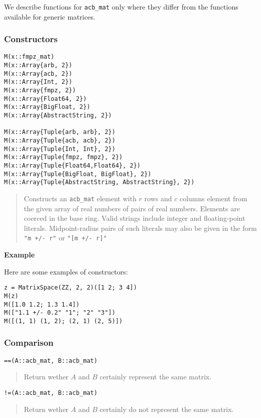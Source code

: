 \documentclass[a4paper,10pt]{article}
\newcommand{\code}{\lstinline}
\newcommand{\desc}[1]{\vspace{-3mm}\begin{quote}#1\end{quote}}
\begin{document}
{{We describe functions for \code{acb_mat} only where they differ from the functions
available for generic matrices.

\subsubsection{Constructors}

\begin{lstlisting}
M(x::fmpz_mat)
M(x::Array{arb, 2})
M(x::Array{acb, 2})
M(x::Array{Int, 2})
M(x::Array{fmpz, 2})
M(x::Array{Float64, 2})
M(x::Array{BigFloat, 2})
M(x::Array{AbstractString, 2})

M(x::Array{Tuple{arb, arb}, 2})
M(x::Array{Tuple{acb, acb}, 2})
M(x::Array{Tuple{Int, Int}, 2})
M(x::Array{Tuple{fmpz, fmpz}, 2})
M(x::Array{Tuple{Float64,Float64}, 2})
M(x::Array{Tuple{BigFloat, BigFloat}, 2})
M(x::Array{Tuple{AbstractString, AbstractString}, 2})

\end{lstlisting}

\desc{Constructs an \code{acb_mat} element with $r$ rows and $c$ columns element
from the given array of real numbers of pairs of real numbers. Elements are coerced in the base ring.
Valid strings include integer and floating-point literals. Midpoint-radius
pairs of such literals may also be given in the form \code{"m +/- r"}
or \code{"[m +/- r]"}}

\textbf{Example}

Here are some examples of constructors:

\begin{lstlisting}
z = MatrixSpace(ZZ, 2, 2)([1 2; 3 4])
M(z)
M([1.0 1.2; 1.3 1.4])
M(["1.1 +/- 0.2" "1"; "2" "3"])
M([(1, 1) (1, 2); (2, 1) (2, 5)])
\end{lstlisting}

\subsubsection{Comparison}

\begin{lstlisting}
==(A::acb_mat, B::acb_mat)
\end{lstlisting}

\desc{Return wether $A$ and $B$ certainly represent the same matrix.}

\begin{lstlisting}
!=(A::acb_mat, B::acb_mat)
\end{lstlisting}

\desc{Return wether $A$ and $B$ certainly do not represent the same matrix.}

}}
\end{document}
